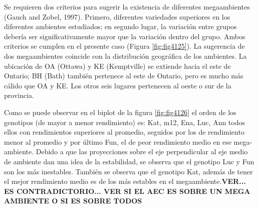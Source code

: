 Se requieren dos criterios para sugerir la existencia de diferentes megaambientes (Gauch and Zobel, 1997). Primero, diferentes variedades superiores en los diferentes ambientes estudiados; en segundo lugar, la variación entre grupos debería ser significativamente mayor que la variación dentro del grupo.  Ambos criterios se cumplen en el presente caso (Figura \ref{fig:fig4125}). La sugerencia de dos megaambientes coincide con la distribución geográfica de los ambientes. La ubicación de OA (Ottawa) y KE (Kemptville) se extiende hacia el este de Ontario; BH (Bath) también pertenece al este de Ontario, pero es mucho más cálido que OA y KE. Los otros seis lugares pertenecen al oeste o sur de la provincia.



Como se puede observar en el biplot de la figura \ref{fig:fig4126} el orden de los genotipos (de mayor a menor rendimiento) es: Kat, m12, Ena, Luc, Ann todos ellos con rendimientos superiores al promedio, seguidos por los de rendimiento menor al promedio y por último Fun, el de peor rendimiento medio en ese mega-ambiente.
Debido a que las proyecciones sobre el eje perpendicular al eje medio de ambiente dan una idea de la estabilidad, se observa que el genotipo Luc y Fun son los más inestables. También se
observa que el genotipo Kat, además de tener el mejor rendimiento medio es de los más estables en el megaambiente.\textbf{VER... ES CONTRADICTORIO... VER SI EL AEC ES SOBRE UN MEGA AMBIENTE O SI ES SOBRE TODOS}

